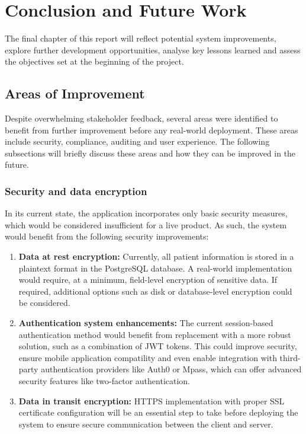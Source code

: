 \chapter{Conclusion and Future Work}

The final chapter of this report will reflect potential system improvements, explore further development opportunities, analyse key lessons learned and assess the objectives set at the beginning of the project.

\section{Areas of Improvement}

Despite overwhelming stakeholder feedback, several areas were identified to benefit from further improvement before any real-world deployment. These areas include security, compliance, auditing and user experience. The following subsections will briefly discuss these areas and how they can be improved in the future.

\subsection{Security and data encryption}

In its current state, the application incorporates only basic security measures, which would be considered insufficient for a live product. As such, the system would benefit from the following security improvements:

\begin{enumerate}
    \item \textbf{Data at rest encryption:} Currently, all patient information is stored in a plaintext format in the PostgreSQL database. A real-world implementation would require, at a minimum, field-level encryption of sensitive data. If required, additional options such as disk or database-level encryption could be considered.
    \item \textbf{Authentication system enhancements:} The current session-based authentication method would benefit from replacement with a more robust solution, such as a combination of JWT tokens. This could improve security, ensure mobile application compatility and even enable integration with third-party authentication providers like Auth0 or Mpass, which can offer advanced security features like two-factor authentication. 
    \item \textbf{Data in transit encryption:} HTTPS implementation with proper SSL certificate configuration will be an essential step to take before deploying the system to ensure secure communication between the client and server.
\end{enumerate}

